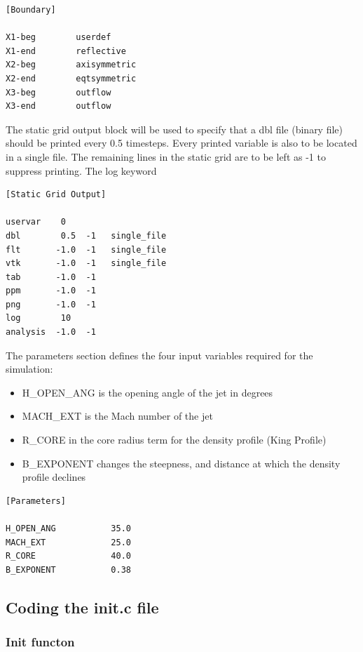 \documentclass[12pt,a4paper]{report}
\begin{document}
\begin{lstlisting}
[Boundary]

X1-beg        userdef
X1-end        reflective
X2-beg        axisymmetric
X2-end        eqtsymmetric
X3-beg        outflow
X3-end        outflow
\end{lstlisting}
The static grid output block will be used to specify that a dbl file (binary file) should be printed every 0.5 timesteps. Every printed variable is also to be located in a single file. The remaining lines in the static grid are to be left as -1 to suppress printing. The log keyword
\begin{lstlisting}
[Static Grid Output]

uservar    0
dbl        0.5  -1   single_file
flt       -1.0  -1   single_file
vtk       -1.0  -1   single_file
tab       -1.0  -1   
ppm       -1.0  -1   
png       -1.0  -1
log        10
analysis  -1.0  -1
\end{lstlisting}
The parameters section defines the four input variables required for the simulation: 
\begin{itemize}
\item H\_OPEN\_ANG is the opening angle of the jet in degrees
\item MACH\_EXT is the Mach number of the jet
\item R\_CORE in the core radius term for the density profile (King Profile)
\item B\_EXPONENT changes the steepness, and distance at which the density profile declines
\end{itemize}
\begin{lstlisting}
[Parameters]

H_OPEN_ANG           35.0  
MACH_EXT             25.0  
R_CORE               40.0
B_EXPONENT           0.38  
\end{lstlisting}


\subsection{Coding the init.c file}
\subsubsection{Init functon}
\end{document}

